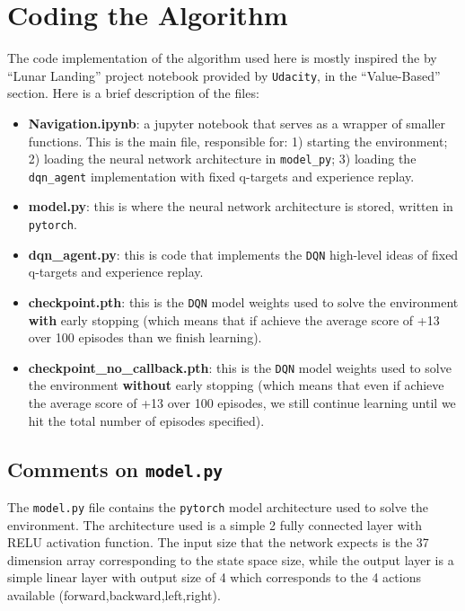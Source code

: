 \documentclass[
]{article}
\begin{document}
\pagebreak

\hypertarget{coding-the-algorithm}{%
\section{Coding the Algorithm}\label{coding-the-algorithm}}

The code implementation of the algorithm used here is mostly inspired
the by ``Lunar Landing'' project notebook provided by \texttt{Udacity},
in the ``Value-Based'' section. Here is a brief description of the
files:

\begin{itemize}
\item
  \textbf{Navigation.ipynb}: a jupyter notebook that serves as a wrapper
  of smaller functions. This is the main file, responsible for: 1)
  starting the environment; 2) loading the neural network architecture
  in \texttt{model\_py}; 3) loading the \texttt{dqn\_agent}
  implementation with fixed q-targets and experience replay.
\item
  \textbf{model.py}: this is where the neural network architecture is
  stored, written in \texttt{pytorch}.
\item
  \textbf{dqn\_agent.py}: this is code that implements the \texttt{DQN}
  high-level ideas of fixed q-targets and experience replay.
\item
  \textbf{checkpoint.pth}: this is the \texttt{DQN} model weights used
  to solve the environment \textbf{with} early stopping (which means
  that if achieve the average score of +13 over 100 episodes than we
  finish learning).
\item
  \textbf{checkpoint\_no\_callback.pth}: this is the \texttt{DQN} model
  weights used to solve the environment \textbf{without} early stopping
  (which means that even if achieve the average score of +13 over 100
  episodes, we still continue learning until we hit the total number of
  episodes specified).
\end{itemize}

\hypertarget{comments-on-model.py}{%
\subsection{\texorpdfstring{Comments on
\texttt{model.py}}{Comments on model.py}}\label{comments-on-model.py}}

The \texttt{model.py} file contains the \texttt{pytorch} model
architecture used to solve the environment. The architecture used is a
simple 2 fully connected layer with RELU activation function. The input
size that the network expects is the 37 dimension array corresponding to
the state space size, while the output layer is a simple linear layer
with output size of 4 which corresponds to the 4 actions available
(forward,backward,left,right).
\end{document}
